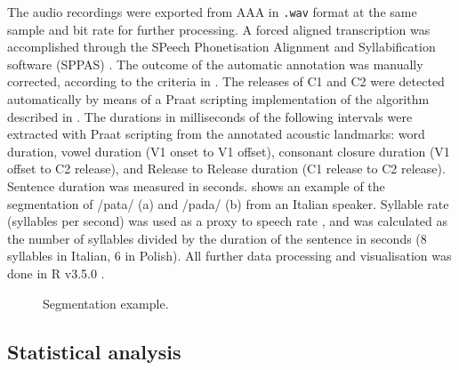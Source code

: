 \documentclass[preprint]{JASAnew}
\begin{document}
The audio recordings were exported from AAA in \texttt{.wav} format at
the same sample and bit rate for further processing. A forced aligned
transcription was accomplished through the SPeech Phonetisation
Alignment and Syllabification software (SPPAS) \citep{bigi2015}. The
outcome of the automatic annotation was manually corrected, according to
the criteria in . The releases of C1 and C2 were
detected automatically by means of a Praat scripting implementation of
the algorithm described in \citet{ananthapadmanabha2014}. The durations
in milliseconds of the following intervals were extracted with Praat
scripting from the annotated acoustic landmarks: word duration, vowel
duration (V1 onset to V1 offset), consonant closure duration (V1 offset
to C2 release), and Release to Release duration (C1 release to C2
release). Sentence duration was measured in seconds.
 shows an example of the segmentation of /pata/ (a)
and /pada/ (b) from an Italian speaker. Syllable rate (syllables per
second) was used as a proxy to speech rate \citep{plug2018}, and was
calculated as the number of syllables divided by the duration of the
sentence in seconds (8 syllables in Italian, 6 in Polish). All further
data processing and visualisation was done in R v3.5.0
\citep{r-core-team2018, wickham2017}.

\begin{figure}
  \caption{Segmentation example.}
  \label{f:segmentation}
\end{figure}

\hypertarget{statistical-analysis}{%
\subsection{Statistical analysis}\label{statistical-analysis}}
\end{document}
